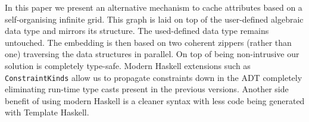 \documentclass[runningheads]{llncs}
\begin{document}
  In this paper we present an alternative mechanism to cache attributes based on
  a self-organising infinite grid. This graph is laid on top of the user-defined
  algebraic data type and mirrors its structure. The used-defined data type
  remains untouched. The embedding is then based on two coherent zippers (rather
  than one) traversing the data structures in parallel. On top of being
  non-intrusive our solution is completely type-safe. Modern Haskell extensions
  such as \texttt{ConstraintKinds} allow us to propagate constraints down in the
  ADT completely eliminating run-time type casts present in the previous
  versions. Another side benefit of using modern Haskell is a cleaner syntax
  with less code being generated with Template Haskell.









\end{document}
